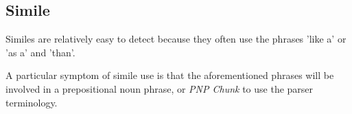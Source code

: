 \subsection{Simile}

Similes are relatively easy to detect because they often use the phrases 'like a' or 'as a' and 'than'.

A particular symptom of simile use is that the aforementioned phrases will be involved in a prepositional noun phrase, or \textit{PNP Chunk} to use the parser terminology.




